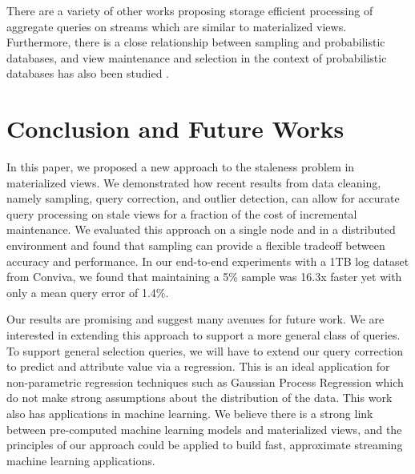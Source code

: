 There are a variety of other works proposing storage efficient processing of aggregate queries on streams \cite{dobra2002processing, greenwald2001space} which are similar to materialized views. Furthermore, there is a close relationship between sampling and probabilistic databases, and view maintenance and selection in the context of probabilistic databases has also been studied \cite{re2007materialized}.

\section{Conclusion and Future Works}
In this paper, we proposed a new approach to the staleness problem in materialized views.
We demonstrated how recent results from data cleaning, namely sampling, query correction, and outlier detection, can
allow for accurate query processing on stale views for a fraction of the cost of incremental maintenance. 
We evaluated this approach on a single node and in a distributed environment and found that sampling can provide a flexible tradeoff 
between accuracy and performance.
In our end-to-end experiments with a 1TB log dataset from Conviva, we found that maintaining a 5\% sample was 16.3x faster yet  with only a mean query error of 1.4\%.

Our results are promising and suggest many avenues for future work.
We are interested in extending this approach to support a more general class of queries.
To support general selection queries, we will have to extend our query correction to predict and attribute value via a regression.
This is an ideal application for non-parametric regression techniques such as Gaussian Process Regression which do
not make strong assumptions about the distribution of the data.
This work also has applications in machine learning.
We believe there is a strong link between pre-computed machine learning models and materialized views, and the principles of our approach could be applied
to build fast, approximate streaming machine learning applications.



